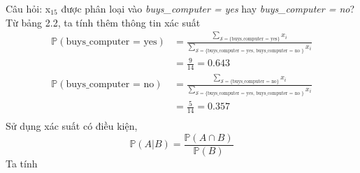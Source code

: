 \documentclass[a4paper, 13pt]{report}
\begin{document}
Câu hỏi: x$_{15}$ được phân loại vào \textit{buys\_computer = yes} hay \textit{buys\_computer = no}?\\
Từ bảng 2.2, ta tính thêm thông tin xác suất
\[
\begin{aligned}
\mathbb{P}(\text{buys\_computer = yes}) & =  \frac{\sum_{\mathcal{S}=\{\text{buys\_computer = yes}\}} x_i}
{\sum_{\mathcal{S}=\{\text{buys\_computer = yes, buys\_computer = no }\}} x_i} \\
         							& = \frac{9}{14} = 0.643\\
\mathbb{P}(\text{buys\_computer = no}) & =  \frac{\sum_{\mathcal{S}=\{\text{buys\_computer = no}\}} x_i}
{\sum_{\mathcal{S}=\{\text{buys\_computer = yes, buys\_computer = no }\}} x_i} \\
									&=\frac{5}{14} = 0.357\\
\end{aligned}
\]
Sử dụng xác suất có điều kiện, 
\[
\mathbb{P}(A|B)=\frac{\mathbb{P}(A\cap B)}{\mathbb{P}(B)}
\]
Ta tính
\end{document}
